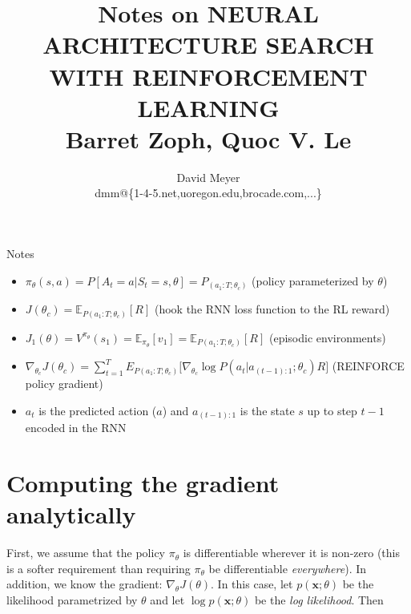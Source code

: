 \documentclass[11pt, oneside]{article}   	%
\title{Notes on NEURAL ARCHITECTURE SEARCH WITH REINFORCEMENT LEARNING \\
Barret Zoph, Quoc V. Le}
\author{David Meyer \\ dmm@\{1-4-5.net,uoregon.edu,brocade.com,...\}}
\begin{document}
\maketitle

Notes
\begin{itemize}
\item $\pi_\theta(s,a) = P[A_t = a | S_t = s, \theta] = P_{(a_1{:T};\theta_c)}$ (policy parameterized by $\theta$)
\item $J(\theta_c) = \mathbb{E}_{P(a_1:T;  \theta_c)} [R]$  (hook the RNN loss function to the RL reward)
\item $J_1(\theta) = V^{\pi_\theta}(s_1) = \mathbb{E}_{\pi_\theta}[v_1] = \mathbb{E}_{P(a_1:T;  \theta_c)}[R]$ (episodic environments)
\item $\nabla_{\theta_{c}} J(\theta_c) = \sum\limits_{t = 1}^{T} E_{P(a_1:T;\theta_c)}
\big[ \nabla_{\theta_c} \log P(a_t | a_{(t-1):1};\theta_c)R \big] $ (REINFORCE policy gradient)
\item $a_t$ is the predicted action ($a$) and $a_{(t-1):1}$ is the state $s$ up to step $t-1$ encoded in the RNN

\end{itemize}

\section{Computing the gradient analytically}

First, we assume that the policy $\pi_\theta$ is differentiable wherever it is non-zero (this is a softer requirement than requiring $\pi_\theta$ be differentiable \emph{everywhere}). In addition, we know the gradient: $\nabla_\theta J(\theta)$. In this case, let  $p(\mathbf{x};\theta)$ be the likelihood parametrized by $\theta$ and let $\log p(\mathbf{x}; \theta)$ be the \emph{log likelihood}. Then
\end{document}
